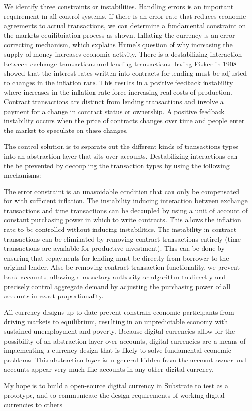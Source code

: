 \documentclass[a4paper]{article}
\begin{document}
    We identify three constraints or instabilities. Handling errors is an important requirement
    in all control systems. If there is an error rate that reduces economic agreements to actual
    transactions, we can determine a fundamental constraint on the markets equilibriation process as
    shown. Inflating the currency is an error correcting mechanism, which explains Hume's question
    of why increasing the supply of money increases economic activity. There is a destabilizing
    interaction between exchange transactions and lending transactions. Irving Fisher in 1908 showed
    that the interest rates written into contracts for lending must be adjusted to changes in the
    inflation rate. This results in a positive feedback instability where increases in the inflation
    rate force increasing real costs of production. Contract transactions are distinct from lending
    transactions and involve a payment for a change in contract status or ownership. A positive
    feedback instability occurs when the price of contracts changes over time and people enter the
    market to speculate on these changes. 

    The control solution is to separate out the different kinds of transactions types into an
    abstraction layer that sits over accounts. Destabilizing interactions can the be prevented by
    decoupling the transaction types by using the following mechanisms:

    The error constraint is an unavoidable condition that can only be compensated for with
    sufficient inflation. The instability inducing interaction between exchange transactions and
    time transactions can be decoupled by using a unit of account of constant purchasing power in
    which to write contracts. This allows the inflation rate to be controlled without inducing
    instabilities. The instability in contract transactions can be eliminated by removing contract
    transactions entirely (time transactions are available for productive investment). This can be
    done by ensuring that repayments for lending must be directly from borrower to the original
    lender. Also be removing contract transaction functionality, we prevent bank accounts, allowing
    a monetary authority or algorithm to directly and precisely control aggregate demand by
    adjusting the purchasing power of all accounts in exact proportionality.

    All currency designs up to date prevent constrain economic participants from driving markets
    to equilibrium, resulting in an unpredictable economy with sustained unemployment and poverty.
    Because digital currencies allow for the possibility of an abstraction layer over accounts,
    digital currencies are a means of implementing a currency design that is likely to solve
    fundamental economic problems. This abstraction layer is in general hidden from the account
    owner and accounts appear very much like accounts in any other digital currency. 

    My hope is to build a open-source digital currency in Substrate to test as a prototype, and to
    communicate the design requirements of working digital currencies to others.
\end{document}
